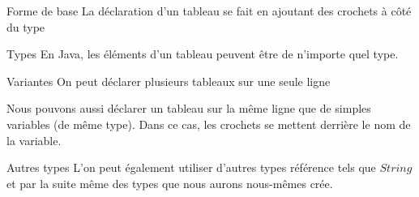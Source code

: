 \begin{frame}{Forme de base}
    \pause
    La déclaration d'un tableau se fait en ajoutant des crochets à côté du type
    

    \pause
    \begin{exampleblock}{Types}
        En Java, les éléments d'un tableau peuvent être de n'importe quel type.
    \end{exampleblock}

    

\end{frame}

\begin{frame}{Variantes}
    \pause
    On peut déclarer plusieurs tableaux sur une seule ligne
    

    \pause
    Nous pouvons aussi déclarer un tableau sur la même ligne que de simples variables (de même type).
    Dans ce cas, les crochets se mettent derrière le nom de la variable.
    
\end{frame}

\begin{frame}{Autres types}
    \pause
    L'on peut également utiliser d'autres types référence tels que $String$ et par la suite même des types que nous aurons nous-mêmes crée.

    
\end{frame}